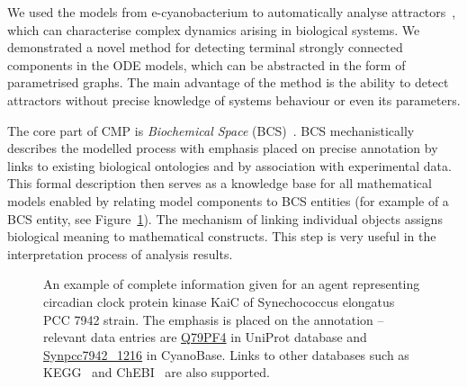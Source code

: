 \documentclass[11pt,a4paper]{report}
\begin{document}
We used the models from e-cyanobacterium to automatically analyse attractors~\cite{benevs2018fully}, which can characterise complex dynamics arising in biological systems. We demonstrated a novel method for detecting terminal strongly connected components in the ODE models, which can be abstracted in the form of parametrised graphs. The main advantage of the method is the ability to detect attractors without precise knowledge of systems behaviour or even its parameters.

The core part of CMP is \emph{Biochemical Space} (BCS)~\cite{BCS}. BCS mechanistically describes the modelled process with emphasis placed on precise annotation by links to existing biological ontologies and by association with experimental data. This formal description then serves as a knowledge base for all mathematical models enabled by relating model components to BCS entities (for example of a BCS entity, see Figure~\ref{entity_example}). The mechanism of linking individual objects assigns biological meaning to mathematical constructs. This step is very useful in the interpretation process of analysis results.

\begin{figure}[!h]
  \begin{center}
  \end{center}
  \caption{An example of complete information given for an agent representing circadian clock protein kinase KaiC of Synechococcus elongatus PCC 7942 strain. The emphasis is placed on the annotation -- relevant data entries are \href{https://www.uniprot.org/uniprot/Q79PF4}{Q79PF4} in UniProt database and \href{http://genome.microbedb.jp/cyanobase/GCA_000012525.1/genes/Synpcc7942_1216}{Synpcc7942\_1216} in CyanoBase. Links to other databases such as KEGG~\cite{KEGG} and ChEBI~\cite{ChEBI} are also supported.}\label{entity_example}
\end{figure}
\end{document}
